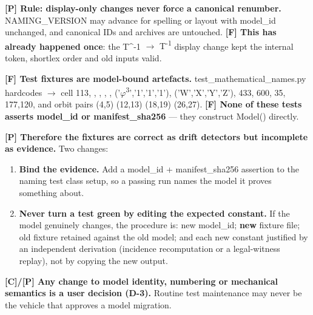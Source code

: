 \documentclass[10pt,a4paper]{article}
\newcommand{\tightlist}{\setlength{\itemsep}{2pt}\setlength{\parskip}{0pt}}
\begin{document}
\textbf{{[}P{]} Rule: display-only changes never force a canonical renumber.} {\codefont NAMING\_\allowbreak{}VERSION} may advance for spelling or layout with {\codefont model\_\allowbreak{}id} unchanged, and canonical IDs and archives are untouched. \textbf{{[}F{]} This has already happened once}: the {\codefont T\textasciicircum{}-\allowbreak{}1} \(\rightarrow\) {\codefont T\textsuperscript{-}\textsuperscript{1}} display change kept the internal token, shortlex order and old inputs valid.

\textbf{{[}F{]} Test fixtures are model-bound artefacts.} {\codefont test\_\allowbreak{}mathematical\_\allowbreak{}names.\allowbreak{}py} hardcodes { \(\rightarrow\) cell 11\allowbreak{}3}, {}, {}, {}, {}, {\codefont ('\(\varphi\)\textsuperscript{3}',\allowbreak{}'1',\allowbreak{}'1',\allowbreak{}'1')}, {\codefont ('W',\allowbreak{}'X',\allowbreak{}'Y',\allowbreak{}'Z')}, 433, 600, 35, 177,120, and orbit pairs {\codefont (4,\allowbreak{}5) (12,\allowbreak{}13) (18,\allowbreak{}19) (26,\allowbreak{}27)}. \textbf{{[}F{]} None of these tests asserts {\codefont model\_\allowbreak{}id} or {\codefont manifest\_\allowbreak{}sha256}} --- they construct {\codefont Model()} directly.

\textbf{{[}P{]} Therefore the fixtures are correct as drift detectors but incomplete as evidence.} Two changes:

\begin{enumerate}
\def\labelenumi{\arabic{enumi}.}
\tightlist
\item
  \textbf{Bind the evidence.} Add a {\codefont model\_\allowbreak{}id} + {\codefont manifest\_\allowbreak{}sha256} assertion to the naming test class setup, so a passing run names the model it proves something about.
\item
  \textbf{Never turn a test green by editing the expected constant.} If the model genuinely changes, the procedure is: new {\codefont model\_\allowbreak{}id}; \textbf{new} fixture file; old fixture retained against the old model; and each new constant justified by an independent derivation (incidence recomputation or a legal-witness replay), not by copying the new output.
\end{enumerate}

\textbf{{[}C{]}/{[}P{]} Any change to model identity, numbering or mechanical semantics is a user decision (D-3).} Routine test maintenance may never be the vehicle that approves a model migration.
\end{document}
